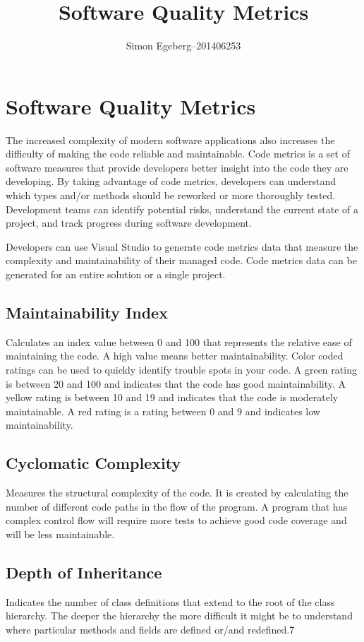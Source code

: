\documentclass{article}
\title{Software Quality Metrics}
\author{Simon Egeberg--201406253}
\begin{document}
\maketitle
\section{Software Quality Metrics}
The increased complexity of modern software applications also increases the difficulty of making the code reliable and maintainable. Code metrics is a set of software measures that provide developers better insight into the code they are developing. By taking advantage of code metrics, developers can understand which types and/or methods should be reworked or more thoroughly tested. Development teams can identify potential risks, understand the current state of a project, and track progress during software development.

Developers can use Visual Studio to generate code metrics data that measure the complexity and maintainability of their managed code. Code metrics data can be generated for an entire solution or a single project.
\subsection{Maintainability Index}
Calculates an index value between 0 and 100 that represents the relative ease of maintaining the code. A high value means better maintainability. Color coded ratings can be used to quickly identify trouble spots in your code. A green rating is between 20 and 100 and indicates that the code has good maintainability. A yellow rating is between 10 and 19 and indicates that the code is moderately maintainable. A red rating is a rating between 0 and 9 and indicates low maintainability.
\subsection{Cyclomatic Complexity}
Measures the structural complexity of the code. It is created by calculating the number of different code paths in the flow of the program. A program that has complex control flow will require more tests to achieve good code coverage and will be less maintainable.
\subsection{Depth of Inheritance}
Indicates the number of class definitions that extend to the root of the class hierarchy. The deeper the hierarchy the more difficult it might be to understand where particular methods and fields are defined or/and redefined.7
\end{document}
